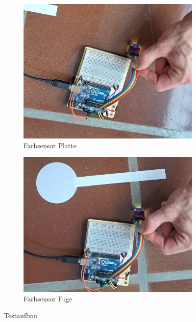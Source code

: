 \begin{figure}[H]
    \vspace{0.5cm}

    \begin{subfigure}{0.3\textwidth}
        \centering
        \includegraphics[width=\linewidth]{img/sensortest/Farbsensor_Platte.jpg}
        \caption{Farbsensor Platte}
        \label{fig:FarbsensorPlatte}
    \end{subfigure}
    \begin{subfigure}{0.3\textwidth}
        \centering
        \includegraphics[width=\linewidth]{img/sensortest/Farbsensor_Fuge.jpg}
        \caption{Farbsensor Fuge}
        \label{fig:FarbsensorFuge}
    \end{subfigure}

    \caption{Testaufbau}
    \label{fig:Testanordnungen}
\end{figure}



